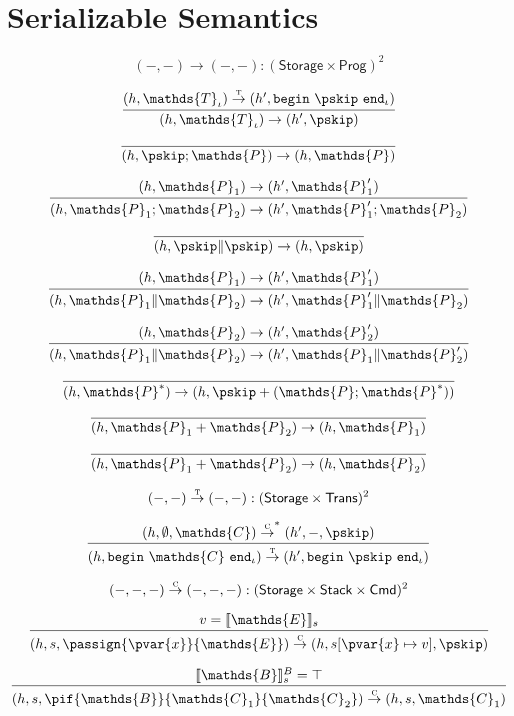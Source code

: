 \section{Serializable Semantics}

\[
(-, -) \rightarrow (-, -) : (\mathsf{Storage} \times \mathsf{Prog})^2
\]

\[
\infer
{
	(h, \mathds{T}_\iota) \rightarrow (h', \pskip)
}
{
	(h, \mathds{T}_\iota) \overset{\textsc{t}}{\rightarrow} (h', \mathtt{begin}\ \pskip\ \mathtt{end}_\iota)
}
\]

\[
\infer
{
	(h, \pskip ; \mathds{P}) \rightarrow (h, \mathds{P})
}
{}
\]

\[
\infer
{
	(h, \mathds{P}_1 ; \mathds{P}_2) \rightarrow (h', \mathds{P}_1' ; \mathds{P}_2)
}
{
	(h, \mathds{P}_1) \rightarrow (h', \mathds{P}_1')
}
\]

\[
\infer
{
	(h, \pskip \| \pskip) \rightarrow (h, \pskip)
}
{}
\]

\[
\infer
{
	(h, \mathds{P}_1 \| \mathds{P}_2) \rightarrow (h', \mathds{P}_1' \| \mathds{P}_2)
}
{
	(h, \mathds{P}_1) \rightarrow (h', \mathds{P}_1')
}
\]

\[
\infer
{
	(h, \mathds{P}_1 \| \mathds{P}_2) \rightarrow (h', \mathds{P}_1 \| \mathds{P}_2')
}
{
	(h, \mathds{P}_2) \rightarrow (h', \mathds{P}_2')
}
\]

\[
\infer
{
	(h, \mathds{P}^*)
	\rightarrow
	(h, \pskip + (\mathds{P} ; \mathds{P}^*))
}
{}
\]

\[
\infer
{
	(h, \mathds{P}_1 + \mathds{P}_2)
	\rightarrow
	(h, \mathds{P}_1)
}
{}
\]

\[
\infer
{
	(h, \mathds{P}_1 + \mathds{P}_2)
	\rightarrow
	(h, \mathds{P}_2)
}
{}
\]

\[
(-, -) \overset{\textsc{t}}{\rightarrow} (-, -) : (\mathsf{Storage} \times \mathsf{Trans})^2
\]

\[
\infer
{
	(h, \mathtt{begin}\ \mathds{C}\ \mathtt{end}_\iota) \overset{\textsc{t}}{\rightarrow} (h', \mathtt{begin}\ \pskip\ \mathtt{end}_\iota)
}
{
	(h, \emptyset, \mathds{C}) \overset{\textsc{c}}{\rightarrow}^* (h', -, \pskip)
}
\]

\[
(-, -, -) \overset{\textsc{c}}{\rightarrow} (-, -, -) : (\mathsf{Storage} \times \mathsf{Stack} \times \mathsf{Cmd})^2
\]

\[
\infer
{
	(h, s, \passign{\pvar{x}}{\mathds{E}})
	\overset{\textsc{c}}{\rightarrow}
	(h, s[\pvar{x} \mapsto v], \pskip)
}
{
	v = \llbracket \mathds{E} \rrbracket_s
}
\]

\[
\infer
{
	(h, s, \pif{\mathds{B}}{\mathds{C}_1}{\mathds{C}_2})
	\overset{\textsc{c}}{\rightarrow}
	(h, s, \mathds{C}_1)
}
{
	\llbracket \mathds{B} \rrbracket_s^B = \top
}
\]

